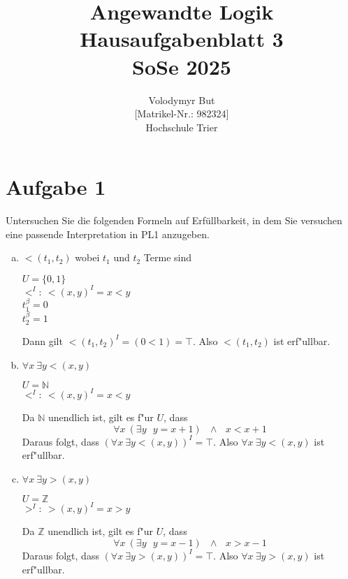 \documentclass[10pt, oneside]{article}
\title{Angewandte Logik\\[15pt]\Large{Hausaufgabenblatt 3}\\[10pt]\Large{SoSe 2025}}
\author{Volodymyr But\\[5pt][Matrikel-Nr.: 982324]\\[10pt]Hochschule Trier}
\date{}
\begin{document}
\maketitle
\vspace{25px}

\section{Aufgabe 1}

Untersuchen Sie die folgenden Formeln auf Erfüllbarkeit, in dem Sie versuchen
eine passende Interpretation in PL1 anzugeben.
\begin{enumerate}[(a)]
    \item $<(t_1, t_2)$ wobei $t_1$ und $t_2$ Terme sind

        $U = \{0, 1\}$ \\[5pt]
        $<^I :\: <(x, y)^I = x < y$ \\[5pt]
        $t_1^{\beta} = 0$ \\[5pt]
        $t_2^{\beta} = 1$

        Dann gilt $<(t_1, t_2)^I = (0 < 1) = \top$. Also $<(t_1, t_2)$ ist erf"ullbar.

    \item $\forall x \ \exists y <(x, y)$

        $U = \mathbb{N}$ \\[5pt]
        $<^I :\: <(x, y)^I = x < y$

        Da $\mathbb{N}$ unendlich ist, gilt es f"ur $U$, dass
        \begin{equation*}
            \forall x \ (\exists y \:\:\: y = x + 1) \:\:\: \land \:\:\: x < x + 1
        \end{equation*}
        Daraus folgt, dass
        $(\forall x\ \exists y < (x, y))^I = \top$. Also $\forall x\ \exists y < (x, y)$ ist erf"ullbar.

    \item $\forall x \ \exists y >(x, y)$

        $U = \mathbb{Z}$ \\[5pt]
        $>^I :\: >(x, y)^I = x > y$

        Da $\mathbb{Z}$ unendlich ist, gilt es f"ur $U$, dass
        \begin{equation*}
            \forall x \ (\exists y \:\:\: y = x - 1) \:\:\: \land \:\:\: x > x - 1
        \end{equation*}
        Daraus folgt, dass
        $(\forall x\ \exists y > (x, y))^I = \top$. Also $\forall x\ \exists y > (x, y)$ ist erf"ullbar.


\end{enumerate}
\end{document}

